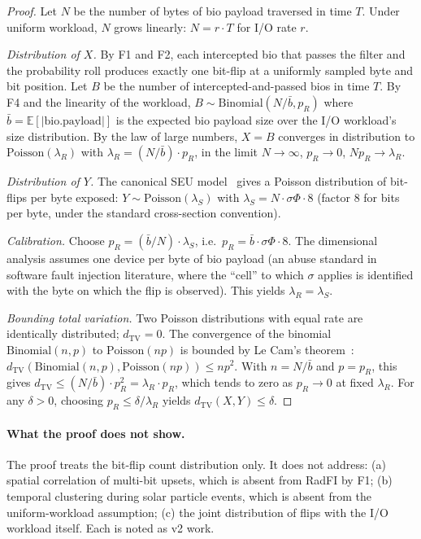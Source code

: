 \begin{proof}
Let \(N\) be the number of bytes of bio payload traversed in time
\(T\). Under uniform workload, \(N\) grows linearly:
\(N = r \cdot T\) for I/O rate \(r\).

\emph{Distribution of \(X\).} By F1 and F2, each intercepted bio
that passes the filter and the probability roll produces exactly one
bit-flip at a uniformly sampled byte and bit position. Let \(B\) be
the number of intercepted-and-passed bios in time \(T\). By F4 and
the linearity of the workload,
\(B \sim \text{Binomial}(N / \bar{b}, p_R)\) where
\(\bar{b} = \mathbb{E}[|\text{bio.payload}|]\) is the expected bio
payload size over the I/O workload's size distribution. By the law of large numbers,
\(X = B\) converges in distribution to
\(\text{Poisson}(\lambda_R)\) with
\(\lambda_R = (N / \bar{b}) \cdot p_R\), in the limit
\(N \to \infty\), \(p_R \to 0\), \(N p_R \to \lambda_R\).

\emph{Distribution of \(Y\).} The canonical SEU
model~\cite{dodd2003seu,petersen1996crosssection} gives a Poisson
distribution of bit-flips per byte exposed:
\(Y \sim \text{Poisson}(\lambda_S)\) with
\(\lambda_S = N \cdot \sigma \Phi \cdot 8\) (factor 8 for bits per
byte, under the standard cross-section convention).

\emph{Calibration.} Choose \(p_R = (\bar{b} / N) \cdot \lambda_S\),
i.e.\ \(p_R = \bar{b} \cdot \sigma \Phi \cdot 8\). The dimensional
analysis assumes one device per byte of bio payload (an abuse
standard in software fault injection literature, where the
``cell'' to which \(\sigma\) applies is identified with the byte
on which the flip is observed). This yields \(\lambda_R = \lambda_S\).

\emph{Bounding total variation.} Two Poisson distributions with
equal rate are identically distributed; \(d_{\text{TV}} = 0\). The
convergence of the binomial \(\text{Binomial}(n, p)\) to
\(\text{Poisson}(np)\) is bounded by Le Cam's
theorem~\cite{lecam1960poisson}:
\(d_{\text{TV}}(\text{Binomial}(n, p), \text{Poisson}(np)) \leq n p^2\).
With \(n = N / \bar{b}\) and \(p = p_R\), this gives
\(d_{\text{TV}} \leq (N/\bar{b}) \cdot p_R^2 = \lambda_R \cdot p_R\),
which tends to zero as \(p_R \to 0\) at fixed \(\lambda_R\). For
any \(\delta > 0\), choosing \(p_R \leq \delta / \lambda_R\)
yields \(d_{\text{TV}}(X, Y) \leq \delta\).
\end{proof}

\paragraph{What the proof does not show.}
The proof treats the bit-flip count distribution only. It does not
address: (a) spatial correlation of multi-bit upsets, which is
absent from RadFI by F1; (b) temporal clustering during solar
particle events, which is absent from the uniform-workload
assumption; (c) the joint distribution of flips with the I/O
workload itself. Each is noted as v2 work.
